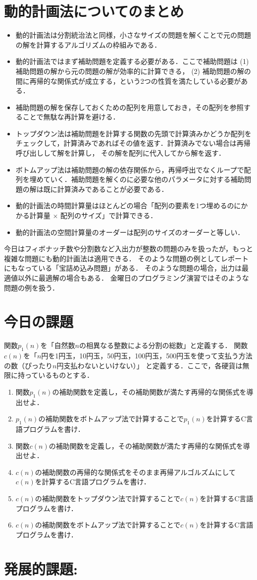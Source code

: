 \documentclass[a4paper,twoside,onecolumn,openany,article]{memoir}
\theoremstyle{remark}
\begin{document}
\section{動的計画法についてのまとめ}
\begin{itemize}
\item 動的計画法は分割統治法と同様，小さなサイズの問題を解くことで元の問題の解を計算するアルゴリズムの枠組みである．
\item 動的計画法ではまず補助問題を定義する必要がある．ここで補助問題は (1) 補助問題の解から元の問題の解が効率的に計算できる，
(2) 補助問題の解の間に再帰的な関係式が成立する，という2つの性質を満たしている必要がある．
\item 補助問題の解を保存しておくための配列を用意しておき，その配列を参照することで無駄な再計算を避ける．
\item トップダウン法は補助問題を計算する関数の先頭で計算済みかどうか配列をチェックして，計算済みであればその値を返す．計算済みでない場合は再帰呼び出しして解を計算し，
その解を配列に代入してから解を返す．
\item ボトムアップ法は補助問題の解の依存関係から，再帰呼出でなくループで配列を埋めていく．補助問題を解くのに必要な他のパラメータに対する補助問題の解は既に計算済みであることが必要である．
\item 動的計画法の時間計算量はほとんどの場合「配列の要素を1つ埋めるのにかかる計算量 $\times$ 配列のサイズ」で計算できる．
\item 動的計画法の空間計算量のオーダーは配列のサイズのオーダーと等しい．
\end{itemize}
今日はフィボナッチ数や分割数など入出力が整数の問題のみを扱ったが，もっと複雑な問題にも動的計画法は適用できる．
そのような問題の例としてレポートにもなっている「宝詰め込み問題」がある．
そのような問題の場合，出力は最適値以外に最適解の場合もある．
金曜日のプログラミング演習ではそのような問題の例を扱う．

\section{今日の課題}
関数$p_1(n)$を「自然数$n$の相異なる整数による分割の総数」と定義する．
関数$c(n)$を「$n$円を1円玉，10円玉，50円玉，100円玉，500円玉を使って支払う方法の数（ぴったり$n$円支払わないといけない）」
と定義する．ここで，各硬貨は無限に持っているものとする．
\begin{enumerate}
\item 関数$p_1(n)$の補助関数を定義し，その補助関数が満たす再帰的な関係式を導出せよ．
\item $p_1(n)$の補助関数をボトムアップ法で計算することで$p_1(n)$を計算するC言語プログラムを書け．
\item 関数$c(n)$の補助関数を定義し，その補助関数が満たす再帰的な関係式を導出せよ．
\item $c(n)$の補助関数の再帰的な関係式をそのまま再帰アルゴルズムにして$c(n)$を計算するC言語プログラムを書け．
\item $c(n)$の補助関数をトップダウン法で計算することで$c(n)$を計算するC言語プログラムを書け．
\item $c(n)$の補助関数をボトムアップ法で計算することで$c(n)$を計算するC言語プログラムを書け．
\end{enumerate}

\section*{発展的課題:}
\end{document}
